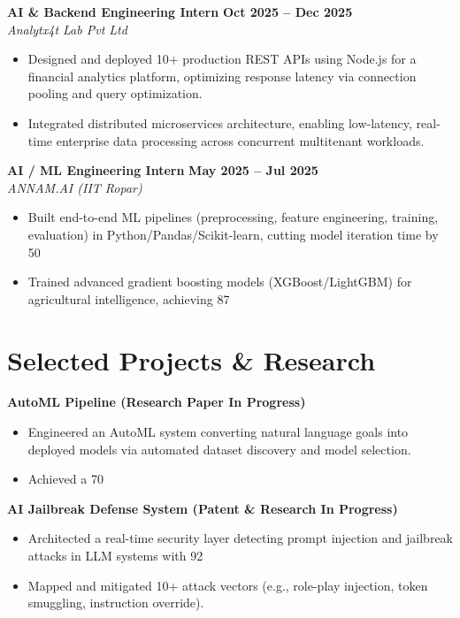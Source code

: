 \documentclass[10pt, letterpaper]{article}
\begin{document}
\textbf{AI & Backend Engineering Intern} \hfill \textbf{Oct 2025 – Dec 2025} \\
\textit{Analytx4t Lab Pvt Ltd}
\begin{itemize}[leftmargin=*, itemsep=2pt]
    \item Designed and deployed 10+ production REST APIs using Node.js for a financial analytics platform, optimizing response latency via connection pooling and query optimization.
    \item Integrated distributed microservices architecture, enabling low-latency, real-time enterprise data processing across concurrent multitenant workloads.
\end{itemize}

\vspace{6pt}

\textbf{AI / ML Engineering Intern} \hfill \textbf{May 2025 – Jul 2025} \\
\textit{ANNAM.AI (IIT Ropar)}
\begin{itemize}[leftmargin=*, itemsep=2pt]
    \item Built end-to-end ML pipelines (preprocessing, feature engineering, training, evaluation) in Python/Pandas/Scikit-learn, cutting model iteration time by 50%
    \item Trained advanced gradient boosting models (XGBoost/LightGBM) for agricultural intelligence, achieving 87%
\end{itemize}

\section*{Selected Projects & Research}

\textbf{AutoML Pipeline (Research Paper In Progress)}
\begin{itemize}[leftmargin=*, itemsep=2pt]
    \item Engineered an AutoML system converting natural language goals into deployed models via automated dataset discovery and model selection.
    \item Achieved a 70%
\end{itemize}

\textbf{AI Jailbreak Defense System (Patent & Research In Progress)}
\begin{itemize}[leftmargin=*, itemsep=2pt]
    \item Architected a real-time security layer detecting prompt injection and jailbreak attacks in LLM systems with 92%
    \item Mapped and mitigated 10+ attack vectors (e.g., role-play injection, token smuggling, instruction override).
\end{itemize}
\end{document}
